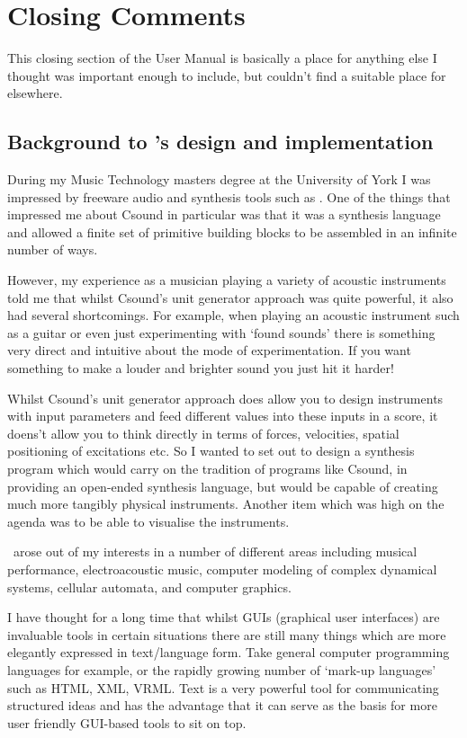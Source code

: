 \chapter{Closing Comments}
This closing section of the User Manual is basically a place for
anything else I thought was important enough to include, but couldn't
find a suitable place for elsewhere.

\section{Background to \tao's design and implementation}
During my Music Technology masters degree at the University of York I was
impressed by freeware audio and synthesis tools such as .
One of the things that impressed me about Csound in particular was that
it was a synthesis language and allowed a finite set of primitive
building blocks to be assembled in an infinite number of ways. 

However, my experience as a musician playing a variety of acoustic
instruments told me that whilst Csound's unit generator approach was
quite powerful, it also had several shortcomings. For example, when
playing an acoustic instrument such as a guitar or even just experimenting
with `found sounds' there is something very direct and intuitive about
the mode of experimentation. If you want something to make a louder
and brighter sound you just hit it harder!

Whilst Csound's unit
generator approach does allow you to design instruments with input
parameters and feed different values into these inputs in a score,
it doens't allow you to think directly in terms of forces, velocities,
spatial positioning of excitations etc. So I wanted to set out to
design a synthesis program which would carry on the tradition of
programs like Csound, in providing an open-ended synthesis language,
but would be capable of creating much more tangibly physical
instruments. Another item which was high on the agenda was to be able
to visualise the instruments.

\tao\ arose out of my interests in a number of different areas
including musical performance, electroacoustic music, computer
modeling of complex dynamical systems, cellular automata, and
computer graphics.

I have thought for a long time that whilst GUIs (graphical
user interfaces) are invaluable tools in certain situations there are
still many things which are more elegantly expressed in text/language
form. Take general computer programming languages for example, or
the rapidly growing number of `mark-up languages' such as HTML, XML,
VRML. Text is a very powerful tool for communicating structured
ideas and has the advantage that it can serve as the basis for
more user friendly GUI-based tools to sit on top.


